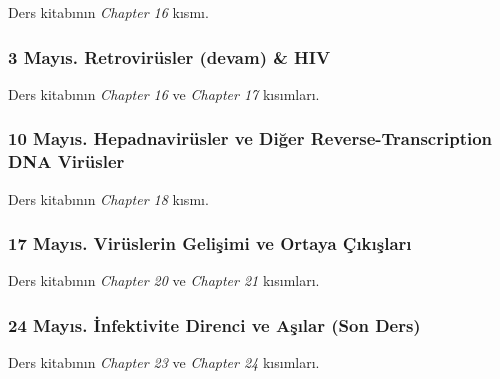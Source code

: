 Ders kitabının \emph{Chapter 16} kısmı.

\subsubsection{3 Mayıs. Retrovirüsler (devam) \&
HIV}\label{mayux131s.-retroviruxfcsler-devam-hiv}

Ders kitabının \emph{Chapter 16} ve \emph{Chapter 17} kısımları.

\subsubsection{10 Mayıs. Hepadnavirüsler ve Diğer Reverse-Transcription
DNA
Virüsler}\label{mayux131s.-hepadnaviruxfcsler-ve-diux11fer-reverse-transcription-dna-viruxfcsler}

Ders kitabının \emph{Chapter 18} kısmı.

\subsubsection{17 Mayıs. Virüslerin Gelişimi ve Ortaya
Çıkışları}\label{mayux131s.-viruxfcslerin-geliux15fimi-ve-ortaya-uxe7ux131kux131ux15flarux131}

Ders kitabının \emph{Chapter 20} ve \emph{Chapter 21} kısımları.

\subsubsection{24 Mayıs. İnfektivite Direnci ve Aşılar (Son
Ders)}\label{mayux131s.-infektivite-direnci-ve-aux15fux131lar-son-ders}

Ders kitabının \emph{Chapter 23} ve \emph{Chapter 24} kısımları.
